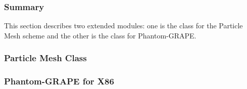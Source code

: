 \subsubsection{Summary}

This section describes two extended modules: one is the class for the
Particle Mesh scheme and the other is the class for Phantom-GRAPE.


\subsubsection{Particle Mesh Class}
\label{sec:module_extended_PM}



\subsubsection{Phantom-GRAPE for X86}


